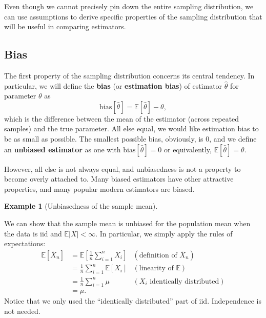 \documentclass[
  letterpaper,
  DIV=11,
  numbers=noendperiod]{scrreprt}
\newcommand{\E}{\mathbb{E}}
\newcommand{\Xbar}{\overline{X}}
\theoremstyle{definition}
\newtheorem{example}{Example}[chapter]
\theoremstyle{definition}
\theoremstyle{plain}
\theoremstyle{remark}
\begin{document}
Even though we cannot precisely pin down the entire sampling
distribution, we can use assumptions to derive specific properties of
the sampling distribution that will be useful in comparing estimators.

\hypertarget{bias}{%
\subsection{Bias}\label{bias}}

The first property of the sampling distribution concerns its central
tendency. In particular, we will define the \textbf{bias} (or
\textbf{estimation bias}) of estimator \(\widehat{\theta}\) for
parameter \(\theta\) as \[
\text{bias}[\widehat{\theta}] = \E[\widehat{\theta}] - \theta,
\] which is the difference between the mean of the estimator (across
repeated samples) and the true parameter. All else equal, we would like
estimation bias to be as small as possible. The smallest possible bias,
obviously, is 0, and we define an \textbf{unbiased estimator} as one
with \(\text{bias}[\widehat{\theta}] = 0\) or equivalently,
\(\E[\widehat{\theta}] = \theta\).

However, all else is not always equal, and unbiasedness is not a
property to become overly attached to. Many biased estimators have other
attractive properties, and many popular modern estimators are biased.

\begin{example}[Unbiasedness of the sample
mean]\protect\hypertarget{exm-mean-unbiased}{}\label{exm-mean-unbiased}

We can show that the sample mean is unbiased for the population mean
when the data is iid and \(\E|X| < \infty\). In particular, we simply
apply the rules of expectations: \[\begin{aligned}
\E\left[ \Xbar_n \right] &= \E\left[\frac{1}{n} \sum_{i=1}^n X_i\right] & (\text{definition of } \Xbar_n) \\
&= \frac{1}{n} \sum_{i=1}^n \E[X_i] & (\text{linearity of } \E)\\
&= \frac{1}{n} \sum_{i=1}^n \mu & (X_i \text{ identically distributed})\\
&= \mu.
\end{aligned}\] Notice that we only used the ``identically distributed''
part of iid. Independence is not needed.

\end{example}
\end{document}
